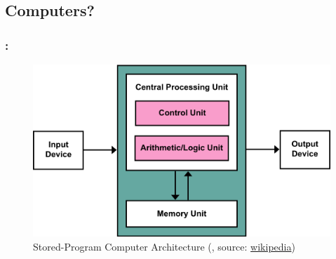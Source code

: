 \documentclass[9pt,xcolor=table]{beamer}
\begin{document}
\subsection{Computers?}
\begin{frame}[c]
\frametitle{\insertsectionhead{}: \insertsubsection{}}
\begin{figure}[htb]
\includegraphics[height=0.65\textheight]{img/Von_Neumann_Architecture}\\[12pt]\Large
Stored-Program Computer Architecture (\cite{VonNeumann}, source: \href{http://en.wikipedia.org/wiki/Von_Neumann_architecture}{wikipedia})
\end{figure}
\end{frame}
\end{document}
